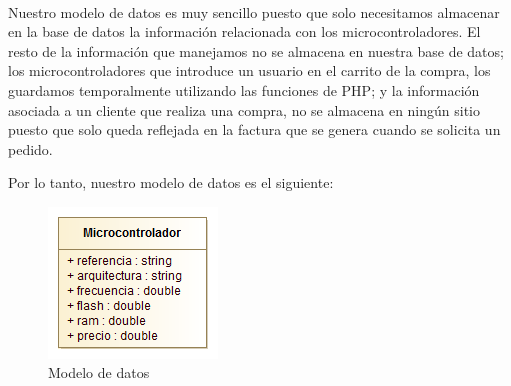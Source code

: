\paragraph{}Nuestro modelo de datos es muy sencillo puesto que solo necesitamos almacenar en la base de datos la información relacionada con los microcontroladores. El resto de la información que manejamos no se almacena en nuestra base de datos; los microcontroladores que introduce un usuario en el carrito de  la compra, los guardamos temporalmente utilizando las funciones de PHP; y la información asociada a un  cliente que realiza una compra, no se almacena en ningún sitio puesto que solo queda reflejada en la factura que se genera cuando se solicita un pedido. \newline

\noindent Por lo tanto, nuestro modelo de datos es el siguiente:

\begin{figure}[h!]
\centering
\includegraphics[width=0.40\textwidth]{img/modelo_datos}
\caption{Modelo de datos}
 \label{fig:modelo_datos}
\end{figure}
